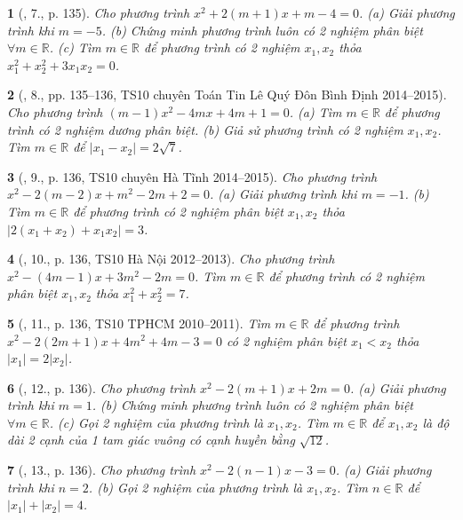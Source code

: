 \documentclass{article}
\newtheorem{baitoan}{}
\begin{document}
\begin{baitoan}[\cite{Thu_Viet_Minh_ptb2}, 7., p. 135]
	Cho phương trình $x^2 + 2(m + 1)x + m - 4 = 0$. (a) Giải phương trình khi $m = -5$. (b) Chứng minh phương trình luôn có 2 nghiệm phân biệt $\forall m\in\mathbb{R}$. (c) Tìm $m\in\mathbb{R}$ để phương trình có 2 nghiệm $x_1,x_2$ thỏa $x_1^2 + x_2^2 + 3x_1x_2 = 0$.
\end{baitoan}

\begin{baitoan}[\cite{Thu_Viet_Minh_ptb2}, 8., pp. 135--136, TS10 chuyên Toán Tin Lê Quý Đôn Bình Định 2014--2015]
	Cho phương trình $(m - 1)x^2 - 4mx + 4m + 1 = 0$. (a) Tìm $m\in\mathbb{R}$ để phương trình có 2 nghiệm dương phân biệt. (b) Giả sử phương trình có 2 nghiệm $x_1,x_2$. Tìm $m\in\mathbb{R}$ để $|x_1 - x_2| = 2\sqrt{7}$.
\end{baitoan}

\begin{baitoan}[\cite{Thu_Viet_Minh_ptb2}, 9., p. 136, TS10 chuyên Hà Tĩnh 2014--2015]
	Cho phương trình $x^2 - 2(m - 2)x + m^2 - 2m + 2 = 0$. (a) Giải phương trình khi $m = -1$. (b) Tìm $m\in\mathbb{R}$ để phương trình có 2 nghiệm phân biệt $x_1,x_2$ thỏa $|2(x_1 + x_2) + x_1x_2| = 3$.
\end{baitoan}

\begin{baitoan}[\cite{Thu_Viet_Minh_ptb2}, 10., p. 136, TS10 Hà Nội 2012--2013]
	Cho phương trình $x^2 - (4m - 1)x + 3m^2 - 2m = 0$. Tìm $m\in\mathbb{R}$ để phương trình có 2 nghiệm phân biệt $x_1,x_2$ thỏa $x_1^2 + x_2^2 = 7$.
\end{baitoan}

\begin{baitoan}[\cite{Thu_Viet_Minh_ptb2}, 11., p. 136, TS10 TPHCM 2010--2011]
	Tìm $m\in\mathbb{R}$ để phương trình $x^2 - 2(2m + 1)x + 4m^2 + 4m - 3 = 0$ có 2 nghiệm phân biệt $x_1 < x_2$ thỏa $|x_1| = 2|x_2|$.
\end{baitoan}

\begin{baitoan}[\cite{Thu_Viet_Minh_ptb2}, 12., p. 136]
	Cho phương trình $x^2 - 2(m + 1)x + 2m = 0$. (a) Giải phương trình khi $m = 1$. (b) Chứng minh phương trình luôn có 2 nghiệm phân biệt $\forall m\in\mathbb{R}$. (c) Gọi 2 nghiệm của phương trình là $x_1,x_2$. Tìm $m\in\mathbb{R}$ để $x_1,x_2$ là độ dài 2 cạnh của 1 tam giác vuông có cạnh huyền bằng $\sqrt{12}$.
\end{baitoan}

\begin{baitoan}[\cite{Thu_Viet_Minh_ptb2}, 13., p. 136]
	Cho phương trình $x^2 - 2(n - 1)x - 3 = 0$. (a) Giải phương trình khi $n = 2$. (b) Gọi 2 nghiệm của phương trình là $x_1,x_2$. Tìm $n\in\mathbb{R}$ để $|x_1| + |x_2| = 4$.
\end{baitoan}
\end{document}

